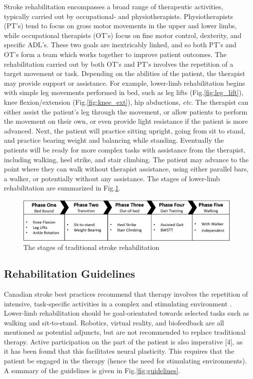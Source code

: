 \documentclass[12pt]{report}
\begin{document}
Stroke rehabilitation encompasses a broad range of therapeutic activities, typically carried out by occupational- and physiotherapists. Physiotherapists (PT's) tend to focus on gross motor movements in the upper and lower limbs, while occupational therapists (OT's) focus on fine motor control, dexterity, and specific ADL's. These two goals are inextricably linked, and so both PT's and OT's form a team which works together to improve patient outcomes. The rehabilitation carried out by both OT's and PT's involves the repetition of a target movement or task. Depending on the abilities of the patient, the therapist may provide support or assistance. For example, lower-limb rehabilitation begins with simple leg movements performed in bed, such as leg lifts (Fig.\ref{fig:leg_lift}), knee flexion/extension (Fig.\ref{fig:knee_ext}), hip abductions, \textit{etc}. The therapist can either assist the patient's leg through the movement, or allow patients to perform the movement on their own, or even provide light resistance if the patient is more advanced. Next, the patient will practice sitting upright, going from sit to stand, and  practice bearing weight and balancing while standing. Eventually the patients will be ready for more complex tasks with assistance from the therapist, including walking, heel strike, and stair climbing. The patient may advance to the point where they can walk without therapist assistance, using either parallel bars, a walker, or potentially without any assistance. The stages of lower-limb rehabilitation are summarized in Fig.\ref{fig:stages}.


	\begin{figure}[h] 
		\centering
		\includegraphics[width=\linewidth]{Traditional_therapy}
		\caption{The stages of traditional stroke rehabilitation}
		\label{fig:stages}
	\end{figure}


\subsection{Rehabilitation Guidelines}

Canadian stroke best practices recommend that therapy involves the repetition of intensive, task-specific activities in a complex and stimulating environment \cite{Hebert2016}. Lower-limb rehabilitation should be goal-orientated towards selected tasks such as walking and sit-to-stand. Robotics, virtual reality, and biofeedback are all mentioned as potential adjuncts, but are not recommended to replace traditional therapy.  Active participation on the part of the patient is also imperative [4], as it has been found that this facilitates neural plasticity. This requires that the patient be engaged in the therapy (hence the need for stimulating environments). A summary of the guidelines is given in Fig.\ref{fig:guidelines}. 
\end{document}
